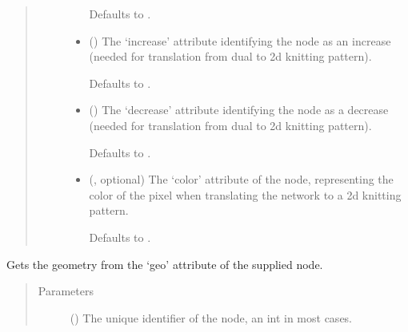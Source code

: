 \documentclass[letterpaper,10pt,english]{sphinxmanual}
\begin{document}
\begin{fulllineitems}
\begin{fulllineitems}
\begin{quote}
\begin{description}
\begin{itemize}
Defaults to .


\item {} 
 (\sphinxstyleliteralemphasis{\sphinxupquote{, }}) \textendash{} 
The ‘increase’ attribute identifying the node as an increase
(needed for translation from dual to 2d knitting pattern).

Defaults to .


\item {} 
 (\sphinxstyleliteralemphasis{\sphinxupquote{, }}) \textendash{} 
The ‘decrease’ attribute identifying the node as a decrease
(needed for translation from dual to 2d knitting pattern).

Defaults to .


\item {} 
 (, optional) \textendash{} 
The ‘color’ attribute of the node, representing the color of the
pixel when translating the network to a 2d knitting pattern.

Defaults to .


\end{itemize}

\end{description}\end{quote}

\end{fulllineitems}


\begin{fulllineitems}
\label{\detokenize{cockatoo:cockatoo.KnitNetworkBase.node_geometry}}
Gets the geometry from the ‘geo’ attribute of the supplied node.
\begin{quote}\begin{description}
\item[{Parameters}] \leavevmode
{} () \textendash{} The unique identifier of the node, an int in most cases.


\end{description}
\end{quote}
\end{fulllineitems}
\end{fulllineitems}
\end{document}
